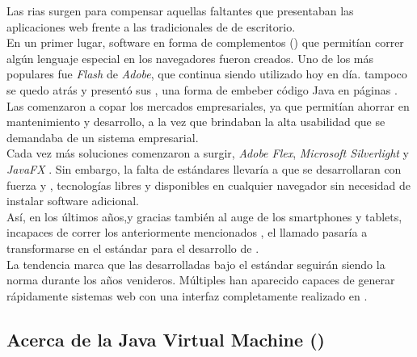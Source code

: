 Las \glspl{ria} surgen para compensar aquellas faltantes que
presentaban las aplicaciones web frente a las tradicionales de \clientserver de
escritorio.\\
En un primer lugar, software en forma de complementos (\plugins) que permitían correr
algún lenguaje especial en los navegadores
fueron creados. Uno de los más populares fue \emph{Flash} de \emph{Adobe}, que continua
siendo utilizado hoy en día. \java tampoco se quedo atrás y presentó sus \servlets,
una forma de embeber código Java en páginas \html.\\
Las \ria comenzaron a copar los mercados empresariales, ya que permitían ahorrar
en mantenimiento y desarrollo, a la vez que brindaban la alta usabilidad que se demandaba
de un sistema empresarial.\\
Cada vez más soluciones comenzaron a surgir, \emph{Adobe Flex},
\emph{Microsoft Silverlight} y \emph{JavaFX} . Sin embargo, la
falta de estándares llevaría a que se desarrollaran con fuerza \css y
\js, tecnologías libres y disponibles en cualquier navegador sin necesidad de
instalar software adicional.\\
Así, en los últimos años,y gracias también al auge de los smartphones y tablets, incapaces
de correr los anteriormente mencionados \plugins, el llamado 
pasaría a transformarse en el estándar para el desarrollo de \rias
{}.\\
La tendencia marca que las \rias desarrolladas bajo el estándar \htmlv seguirán siendo la
norma durante los años venideros. Múltiples \frameworks han aparecido capaces de generar
rápidamente sistemas web con una interfaz completamente realizado en \htmlv.\\



\subsection{Acerca de la Java Virtual Machine (\jvm)}
\label{subsec:intro:about_jvm}


